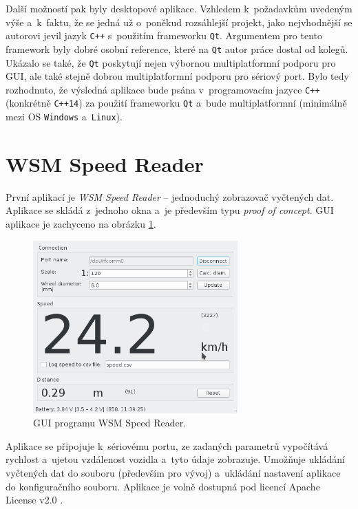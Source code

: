 Další možností pak byly desktopové aplikace. Vzhledem k~požadavkům uvedeným
výše a~k~faktu, že se jedná už o~poněkud rozsáhlejší projekt, jako nejvhodnější
se autorovi jevil jazyk \texttt{C++} s~použitím frameworku \texttt{Qt}.
Argumentem pro tento framework byly dobré osobní reference, které na
\texttt{Qt} autor práce dostal od kolegů. Ukázalo se také, že \texttt{Qt} poskytují
nejen výbornou multiplatformní podporu pro GUI, ale také stejně dobrou
multiplatformní podporu pro sériový port. Bylo tedy rozhodnuto, že výsledná
aplikace bude psána v~programovacím jazyce \texttt{C++} (konkrétně
\texttt{C++14}) za použití frameworku \texttt{Qt} a~bude multiplatformní
(minimálně mezi OS \texttt{Windows} a~\texttt{Linux}).

\section{WSM Speed Reader}
\label{sec:sw-wsm-speed-reader}

První aplikací je \textit{WSM Speed Reader} -- jednoduchý zobrazovač vyčtených
dat. Aplikace se skládá z~jednoho okna a~je především typu
\textit{proof of concept}. GUI aplikace je zachyceno na obrázku
\ref{fig:wsm-speed-reader-gui}.

\begin{figure}[h]
\includegraphics[width=0.7\textwidth]{data/speed_reader_screenshot.png}
\caption{GUI programu WSM Speed Reader.}
\label{fig:wsm-speed-reader-gui}
\end{figure}

Aplikace se připojuje k~sériovému portu, ze zadaných parametrů vypočítává
rychlost a~ujetou vzdálenost vozidla a~tyto údaje zobrazuje. Umožňuje ukládání
vyčtených dat do souboru (především pro vývoj) a~ukládání nastavení aplikace
do konfiguračního souboru. Aplikace je volně dostupná pod licencí Apache
License v2.0 \cite{wsm-speed-reader}.

